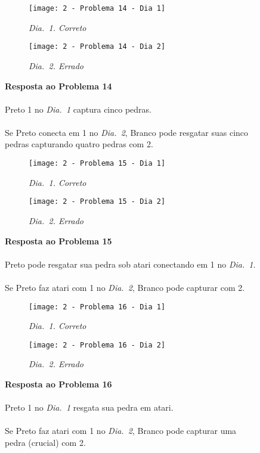 \vfill

\begin{SCfigure}[][h!]
    \begin{subfigure}[t]{.31\textwidth}
        \texttt{[image: 2 - Problema 14 - Dia 1]}
        \caption*{\emph{Dia.\@~1. Correto}}
    \end{subfigure}
    \hfill
    \begin{subfigure}[t]{.31\textwidth}
        \texttt{[image: 2 - Problema 14 - Dia 2]}
        \caption*{\emph{Dia.\@~2. Errado}}
    \end{subfigure}
    \hfill
    \caption*{\textbf{Resposta ao Problema 14}\\\\Preto 1 no \emph{Dia.\@~1} captura cinco pedras.\\\\Se Preto conecta em 1 no \emph{Dia.\@~2}, Branco pode resgatar suas cinco pedras capturando quatro pedras com 2.}
\end{SCfigure}

\vfill

\begin{SCfigure}[][h!]
    \begin{subfigure}[t]{.31\textwidth}
        \texttt{[image: 2 - Problema 15 - Dia 1]}
        \caption*{\emph{Dia.\@~1. Correto}}
    \end{subfigure}
    \hfill
    \begin{subfigure}[t]{.31\textwidth}
        \texttt{[image: 2 - Problema 15 - Dia 2]}
        \caption*{\emph{Dia.\@~2. Errado}}
    \end{subfigure}
    \hfill
    \caption*{\textbf{Resposta ao Problema 15}\\\\Preto pode resgatar sua pedra sob atari conectando em 1 no \emph{Dia.\@~1}.\\\\Se Preto faz atari com 1 no \emph{Dia.\@~2}, Branco pode capturar com 2.}
\end{SCfigure}

\pagebreak

\begin{SCfigure}[][h!]
    \begin{subfigure}[t]{.31\textwidth}
        \texttt{[image: 2 - Problema 16 - Dia 1]}
        \caption*{\emph{Dia.\@~1. Correto}}
    \end{subfigure}
    \hfill
    \begin{subfigure}[t]{.31\textwidth}
        \texttt{[image: 2 - Problema 16 - Dia 2]}
        \caption*{\emph{Dia.\@~2. Errado}}
    \end{subfigure}
    \hfill
    \caption*{\textbf{Resposta ao Problema 16}\\\\Preto 1 no \emph{Dia.\@~1} resgata sua pedra em atari.\\\\Se Preto faz atari com 1 no \emph{Dia.\@~2}, Branco pode capturar uma pedra (crucial) com 2.}
\end{SCfigure}

